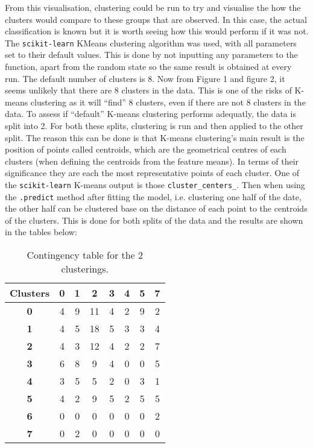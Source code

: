\documentclass[12pt]{report} %
\begin{document}
From this visualisation, clustering could be run to try and visualise the how the clusters would compare to these groups that are observed. In this case, the actual classification is known but it is worth seeing how this would perform if it was not. The \texttt{scikit-learn} KMeans clustering algorithm was used, with all parameters set to their default values. This is done by not inputting any parameters to the function, apart from the random state so the same result is obtained at every run.  
The default number of clusters is 8. Now from Figure 1 and figure 2, it seems unlikely that there are 8 clusters in the data. This is one of the risks of K-means clustering as it will ``find'' 8 clusters, even if there are not 8 clusters in the data. To assess if ``default'' K-means clustering performs adequatly, the data is split into 2. For both these splits, clustering is run and then applied to the other split.  
The reason this can be done is that K-means clustering's main result is the position of points called centroids, which are the geometrical centres of each clusters (when defining the centroids from the feature means). In terms of their significance they are each the most representative points of each cluster. One of the \texttt{scikit-learn} K-means output is those \texttt{cluster\_centers\_}. Then when using the \texttt{.predict{}} method after fitting the model, i.e. clustering one half of the date, the other half can be clustered base on the distance of each point to the centroids of the clusters. This is done for both splits of the data and the results are shown in the tables below:

\begin{table}[h]
\centering
\begin{tabular}{ |c|c|c|c|c|c|c|c| }
    \hline
    \textbf{Clusters} & \textbf{0} & \textbf{1} & \textbf{2} & \textbf{3} & \textbf{4} & \textbf{5} & \textbf{7} \\ 
    \hline
    \textbf{0} & 4 & 9 & 11 & 4 & 2 & 9 & 2 \\
    \hline
    \textbf{1} & 4 & 5 & 18 & 5 & 3 & 3 & 4 \\
    \hline
    \textbf{2} & 4 & 3 & 12 & 4 & 2 & 2 & 7 \\
    \hline
    \textbf{3} & 6 & 8 & 9 & 4 & 0 & 0 & 5 \\
    \hline
    \textbf{4} & 3 & 5 & 5 & 2 & 0 & 3 & 1 \\
    \hline
    \textbf{5} & 4 & 2 & 9 & 5 & 2 & 5 & 5 \\
    \hline
    \textbf{6} & 0 & 0 & 0 & 0 & 0 & 0 & 2 \\
    \hline
    \textbf{7} & 0 & 2 & 0 & 0 & 0 & 0 & 0 \\
    \hline

\end{tabular}
\caption{Contingency table for the 2 clusterings.}
\end{table}
\end{document}
